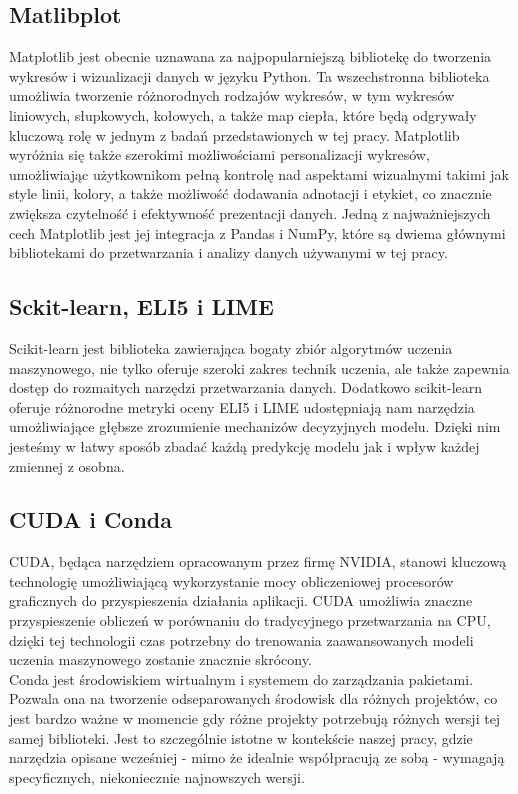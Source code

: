 \documentclass[a4paper,twoside,12pt]{book}
\begin{document}
\subsection{Matlibplot}
Matplotlib jest obecnie uznawana za najpopularniejszą bibliotekę do tworzenia wykresów i wizualizacji danych w języku Python. Ta wszechstronna biblioteka umożliwia tworzenie różnorodnych rodzajów wykresów, w tym wykresów liniowych, słupkowych, kołowych, a także map ciepła, które będą odgrywały kluczową rolę w jednym z badań przedstawionych w tej pracy. Matplotlib wyróżnia się także szerokimi możliwościami personalizacji wykresów, umożliwiając użytkownikom pełną kontrolę nad aspektami wizualnymi takimi jak style linii, kolory, a także możliwość dodawania adnotacji i etykiet, co znacznie zwiększa czytelność i efektywność prezentacji danych. Jedną z najważniejszych cech Matplotlib jest jej integracja z Pandas i NumPy, które są dwiema głównymi bibliotekami do przetwarzania i analizy danych używanymi w tej pracy.

\subsection{Sckit-learn, ELI5 i LIME}
Scikit-learn jest biblioteka zawierająca bogaty zbiór algorytmów uczenia maszynowego, nie tylko oferuje szeroki zakres technik uczenia, ale także zapewnia dostęp do rozmaitych narzędzi przetwarzania danych. Dodatkowo scikit-learn oferuje różnorodne metryki oceny
ELI5 i LIME udostępniają nam narzędzia umożliwiające głębsze zrozumienie mechanizów decyzyjnych modelu. Dzięki nim jesteśmy w łatwy sposób zbadać każdą predykcję modelu jak i wpływ każdej zmiennej z osobna.
\subsection{CUDA i Conda}
CUDA, będąca narzędziem opracowanym przez firmę NVIDIA, stanowi kluczową technologię umożliwiającą wykorzystanie mocy obliczeniowej procesorów graficznych do przyspieszenia działania aplikacji. CUDA umożliwia znaczne przyspieszenie obliczeń w porównaniu do tradycyjnego przetwarzania na CPU, dzięki tej technologii czas potrzebny do trenowania zaawansowanych modeli uczenia maszynowego zostanie znacznie skrócony.\\

Conda jest środowiskiem wirtualnym i systemem do zarządzania pakietami. Pozwala ona na tworzenie odseparowanych środowisk dla różnych projektów, co jest bardzo ważne w momencie gdy różne projekty potrzebują różnych wersji tej samej biblioteki. Jest to szczególnie istotne w kontekście naszej pracy, gdzie narzędzia opisane wcześniej - mimo że idealnie współpracują ze sobą - wymagają specyficznych, niekoniecznie najnowszych wersji.
\end{document}

